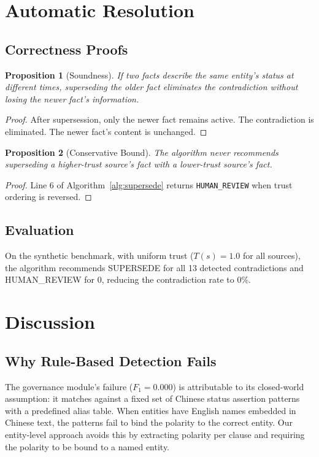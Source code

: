\documentclass{article}
\newtheorem{proposition}{Proposition}
\begin{document}
\section{Automatic Resolution}
\label{sec:algo}

\subsection{Correctness Proofs}

\begin{proposition}[Soundness]
If two facts describe the same entity's status at different times, superseding the older fact eliminates the contradiction without losing the newer fact's information.
\end{proposition}

\begin{proof}
After supersession, only the newer fact remains active. The contradiction is eliminated. The newer fact's content is unchanged.
\end{proof}

\begin{proposition}[Conservative Bound]
The algorithm never recommends superseding a higher-trust source's fact with a lower-trust source's fact.
\end{proposition}

\begin{proof}
Line 6 of Algorithm~\ref{alg:supersede} returns \texttt{HUMAN\_REVIEW} when trust ordering is reversed.
\end{proof}

\subsection{Evaluation}

On the synthetic benchmark, with uniform trust ($T(s) = 1.0$ for all sources), the algorithm recommends SUPERSEDE for all 13 detected contradictions and HUMAN\_REVIEW for 0, reducing the contradiction rate to 0\%.

\section{Discussion}
\label{sec:disc}

\subsection{Why Rule-Based Detection Fails}
The governance module's failure ($F_1 = 0.000$) is attributable to its closed-world assumption: it matches against a fixed set of Chinese status assertion patterns with a predefined alias table. When entities have English names embedded in Chinese text, the patterns fail to bind the polarity to the correct entity. Our entity-level approach avoids this by extracting polarity per clause and requiring the polarity to be bound to a named entity.
\end{document}
